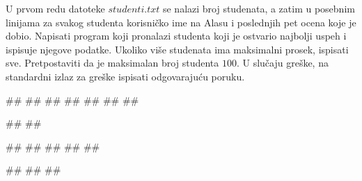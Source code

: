 \begin{Exercise}[label=p3_06] 
 U prvom redu datoteke $studenti.txt$ se nalazi broj studenata, 
 a zatim u posebnim linijama za svakog studenta korisničko ime na Alasu i poslednjih pet ocena koje je dobio. 
 Napisati program koji pronalazi studenta koji je ostvario najbolji 
 uspeh i ispisuje njegove podatke. Ukoliko više studenata ima maksimalni prosek, 
 ispisati sve. 
 Pretpostaviti da je maksimalan broj studenta $100$.
 U slučaju greške, na standardni izlaz za greške ispisati odgovarajuću poruku.

\begin{miditest}
\begin{upotreba}{1}
##
##
##
##
##
##
##

#\naslovIzlaz#
##
\end{upotreba}
\end{miditest}
\begin{miditest}
\begin{upotreba}{2}
##
##
##
##
##

#\naslovIzlaz#
##
##
\end{upotreba}
\end{miditest}
\end{Exercise}
\begin{Answer}[ref=p3_06]
\end{Answer}


